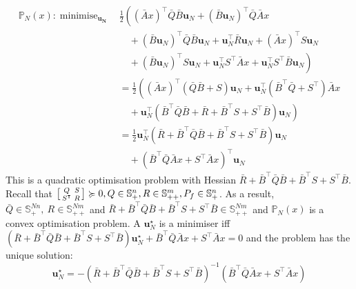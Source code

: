 \documentclass[a4paper,11pt,reqno]{amsart}
\newcommand{\tran}{\intercal}
\DeclareMathOperator*{\minimise}{minimise}
\newcommand{\smallplus}{{\scriptscriptstyle +}}
\newcommand{\Spp}{\mathbb{S}_{\smallplus\smallplus}}
\newcommand{\Sp}{\mathbb{S}_{\smallplus}}
\begin{document}
\begin{subequations}
    \begin{align}
        \mathbb{P}_N(x): \minimise_{\bm{u_N}} \,
        &\tfrac{1}{2}\left((\bar{A}x)^{\tran}\bar{Q}\bar{B}\bm{u}_N+(\bar{B}\bm{u}_N)^{\tran}\bar{Q}\bar{A}x\right.
        \\
        &\quad+(\bar{B}\bm{u}_N)^{\tran}\bar{Q}\bar{B}\bm{u}_N+\bm{u}_N^{\tran}\bar{R}\bm{u}_N+(\bar{A}x)^{\tran}S\bm{u}_N 
        \\
        &\left.\quad+(\bar{B}\bm{u}_N)^{\tran}S\bm{u}_N+\bm{u}_N^{\tran}S^{\tran}\bar{A}x+\bm{u}_N^{\tran}S^{\tran}\bar{B}\bm{u}_N \right) 
        \\
        &=\tfrac{1}{2}\left( (\bar{A}x)^{\tran}(\bar{Q}\bar{B}+S)\bm{u}_N+\bm{u}_N^{\tran}(\bar{B}^{\tran}\bar{Q}+S^{\tran})\bar{A}x\right.
        \\
        &\left.\quad+\bm{u}_N^{\tran}(\bar{B}^{\tran}\bar{Q}\bar{B}+\bar{R}+\bar{B}^{\tran}S+S^{\tran}\bar{B})\bm{u}_N \right)
        \\
        &=\tfrac{1}{2}\bm{u}_N^{\tran}(\bar{R}+\bar{B}^{\tran}\bar{Q}\bar{B}+\bar{B}^{\tran}S+S^{\tran}\bar{B})\bm{u}_N
        \\
        &\quad+(\bar{B}^{\tran}\bar{Q}\bar{A}x+S^{\tran}\bar{A}x)^{\tran}\bm{u}_N
    \end{align}
\end{subequations}
This is a quadratic optimisation problem with Hessian
$\bar{R}+\bar{B}^{\tran}\bar{Q}\bar{B}+\bar{B}^{\tran}S+S^{\tran}\bar{B}$.
Recall that $\begin{bsmallmatrix}Q&S\\S^{\tran}&R\end{bsmallmatrix}\succcurlyeq 0, Q\in \mathbb{S}^n_+, R\in \mathbb{S}^m_{++}, P_f\in \mathbb{S}^n_{+}$.
As a result, $\bar{Q}\in\Sp^{Nn},\ R\in\Spp^{Nm}$ and
$\bar{R}+\bar{B}^{\tran}\bar{Q}\bar{B}+\bar{B}^{\tran}S+S^{\tran}\bar{B}\in\Spp^{Nm}$
and $\mathbb{P}_N(x)$ is a convex optimisation problem.
A $\bm{u}_N^{\star}$ is a minimiser iff
$(\bar{R}+\bar{B}^{\tran}\bar{Q}\bar{B}+\bar{B}^{\tran}S+S^{\tran}\bar{B})\bm{u}_N^{\star}+\bar{B}^{\tran}\bar{Q}\bar{A}x+S^{\tran}\bar{A}x=0$
and the problem has the unique solution:
\begin{equation}
    \bm{u}_N^{\star}=-(\bar{R}+\bar{B}^{\tran}\bar{Q}\bar{B}+\bar{B}^{\tran}S+S^{\tran}\bar{B})^{-1}(\bar{B}^{\tran}\bar{Q}\bar{A}x+S^{\tran}\bar{A}x)
\end{equation}
\
\\ \\
\end{document}
